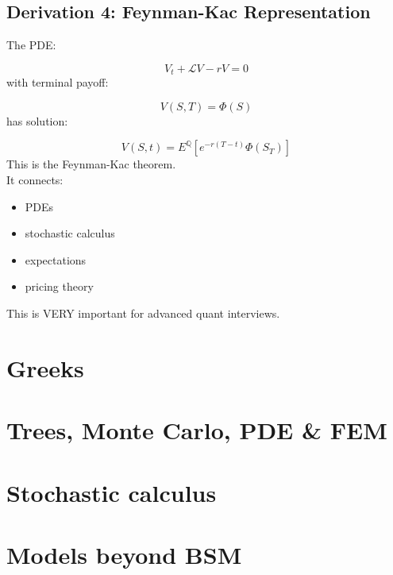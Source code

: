 \documentclass{report}
\begin{document}
\subsection*{Derivation 4: Feynman-Kac Representation}

The PDE:

\[V_t+\mathcal{L}V-rV=0\]
with terminal payoff:

\[V(S,T)=\Phi(S)\]
has solution:

\[V(S,t)=E^{\mathbb{Q}}[e^{-r(T-t)}\Phi(S_T)]\]
This is the Feynman-Kac theorem. \\
It connects:
\begin{itemize}
    \item PDEs
    \item stochastic calculus
    \item expectations
    \item pricing theory
\end{itemize}
This is VERY important for advanced quant interviews.

\subsection*{}

\subsection*{}

\subsection*{}

\subsection*{}

\section{Greeks}
\section{Trees, Monte Carlo, PDE \& FEM}
\section{Stochastic calculus}
\section{Models beyond BSM}
\end{document}
